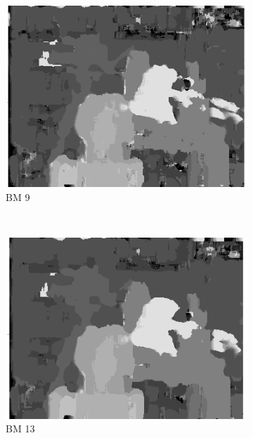 \begin{figure}
  \begin{subfigure}[b]{0.23\textwidth}
    \centering
    \includegraphics[width=\textwidth]{images/stereo-pairs/tsukuba_bm_9.png}
    \caption{BM 9}
  \end{subfigure}
  ~
  \begin{subfigure}[b]{0.23\textwidth}
    \centering
    \includegraphics[width=\textwidth]{images/stereo-pairs/tsukuba_bm_13.png}
    \caption{BM 13}
  \end{subfigure}
  ~
  \begin{subfigure}[b]{0.23\textwidth}
    \centering

\end{subfigure}
\end{figure}
